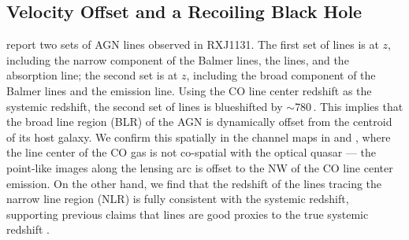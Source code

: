 \documentclass[]{emulateapj}
\begin{document}
\subsection{Velocity Offset and a Recoiling Black Hole}

\citet[hereafter S07]{Sluse07a} report two sets of AGN lines observed in RXJ1131. 
The first set of lines is at $z$, including the narrow component of the Balmer lines, the \oiii lines, and the \mgii absorption line; the second set is at $z$, including the broad component of the Balmer lines and 
the \mgii emission line.
Using the CO line center redshift as the systemic redshift, the second set of lines is blueshifted by $\sim$780\,\kms.
This implies 
that the broad line region (BLR) of the AGN is dynamically offset from the centroid of its host galaxy.
We confirm this spatially in the channel maps in  and 
, where the line center of the CO gas is not co-spatial 
with the optical quasar --- the point-like images along the lensing arc is 
offset to the NW of the CO line center emission. 
On the other hand, we find that the redshift of the \oiii lines tracing the narrow line region (NLR) 
is fully consistent with the systemic redshift, supporting previous claims that \oiii lines are good proxies
to the true systemic redshift \citep[e.g.,][]{Vrtilek85a, Nelson00a}.

\end{document}
